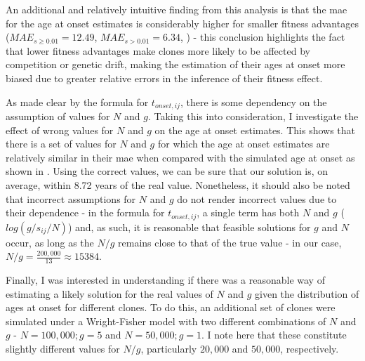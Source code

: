 An additional and relatively intuitive finding from this analysis is that the \ac{mae} for the age at onset estimates is considerably higher for smaller fitness advantages ($MAE_{s \geq 0.01} = 12.49$, $MAE_{s > 0.01} = 6.34$, ) - this conclusion highlights the fact that lower fitness advantages make clones more likely to be affected by competition or genetic drift, making the estimation of their ages at onset more biased due to greater relative errors in the inference of their fitness effect. 

\begin{figure}[h]
	\label{fig:age-at-onset-vs-true-fitness-sim}
\end{figure}

As made clear by the formula for $t_{onset,ij}$, there is some dependency on the assumption of values for $N$ and $g$. Taking this into consideration, I investigate the effect of wrong values for $N$ and $g$ on the age at onset estimates. This shows that there is a set of values for $N$ and $g$ for which the age at onset estimates are relatively similar in their \ac{mae} when compared with the simulated age at onset as shown in . Using the correct values, we can be sure that our solution is, on average, within 8.72 years of the real value. Nonetheless, it should also be noted that incorrect assumptions for $N$ and $g$ do not render incorrect values due to their dependence - in the formula for $t_{onset,ij}$, a single term has both $N$ and $g$ ($log(g/s_{ij}/N)$) and, as such, it is reasonable that feasible solutions for $g$ and $N$ occur, as long as the $N/g$ remains close to that of the true value - in our case, $N/g = \frac{200,000}{13} \approx 15384$.

\begin{figure}[h]
	\label{fig:age-at-onset-mae}
\end{figure}

Finally, I was interested in understanding if there was a reasonable way of estimating a likely solution for the real values of $N$ and $g$ given the distribution of ages at onset for different clones. To do this, an additional set of clones were simulated under a Wright-Fisher model with two different combinations of $N$ and $g$ - $N=100,000;g=5$ and $N=50,000;g=1$. I note here that these constitute slightly different values for $N/g$, particularly $20,000$ and $50,000$, respectively. 

